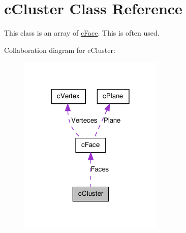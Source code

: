 \hypertarget{classc_cluster}{
\section{cCluster Class Reference}
\label{classc_cluster}
}


This class is an array of \hyperlink{classc_face}{cFace}. This is often used.  




Collaboration diagram for cCluster:
\nopagebreak
\begin{figure}[H]
\begin{center}
\leavevmode
\includegraphics[width=194pt]{classc_cluster__coll__graph}
\end{center}
\end{figure}
